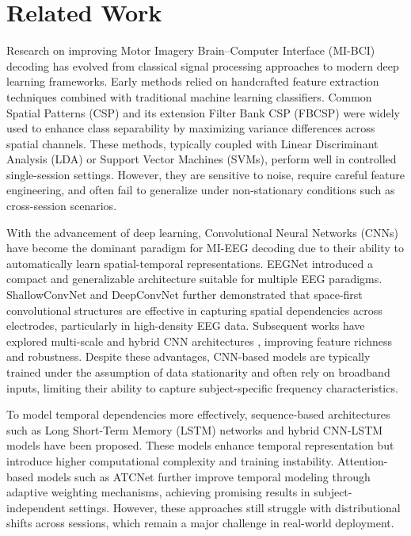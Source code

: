 \documentclass[conference]{IEEEtran}
\begin{document}
\section{Related Work}

Research on improving Motor Imagery Brain--Computer Interface (MI-BCI) decoding has evolved from classical signal processing approaches to modern deep learning frameworks. Early methods relied on handcrafted feature extraction techniques combined with traditional machine learning classifiers. Common Spatial Patterns (CSP) \cite{b8} and its extension Filter Bank CSP (FBCSP) \cite{b9} were widely used to enhance class separability by maximizing variance differences across spatial channels. These methods, typically coupled with Linear Discriminant Analysis (LDA) or Support Vector Machines (SVMs), perform well in controlled single-session settings. However, they are sensitive to noise, require careful feature engineering, and often fail to generalize under non-stationary conditions such as cross-session scenarios.

With the advancement of deep learning, Convolutional Neural Networks (CNNs) have become the dominant paradigm for MI-EEG decoding due to their ability to automatically learn spatial-temporal representations. EEGNet \cite{b10} introduced a compact and generalizable architecture suitable for multiple EEG paradigms. ShallowConvNet and DeepConvNet \cite{b9} further demonstrated that space-first convolutional structures are effective in capturing spatial dependencies across electrodes, particularly in high-density EEG data. Subsequent works have explored multi-scale and hybrid CNN architectures \cite{b15}, improving feature richness and robustness. Despite these advantages, CNN-based models are typically trained under the assumption of data stationarity and often rely on broadband inputs, limiting their ability to capture subject-specific frequency characteristics.

To model temporal dependencies more effectively, sequence-based architectures such as Long Short-Term Memory (LSTM) networks \cite{b11} and hybrid CNN-LSTM models \cite{b12,b13} have been proposed. These models enhance temporal representation but introduce higher computational complexity and training instability. Attention-based models such as ATCNet \cite{b14} further improve temporal modeling through adaptive weighting mechanisms, achieving promising results in subject-independent settings. However, these approaches still struggle with distributional shifts across sessions, which remain a major challenge in real-world deployment.
\end{document}
